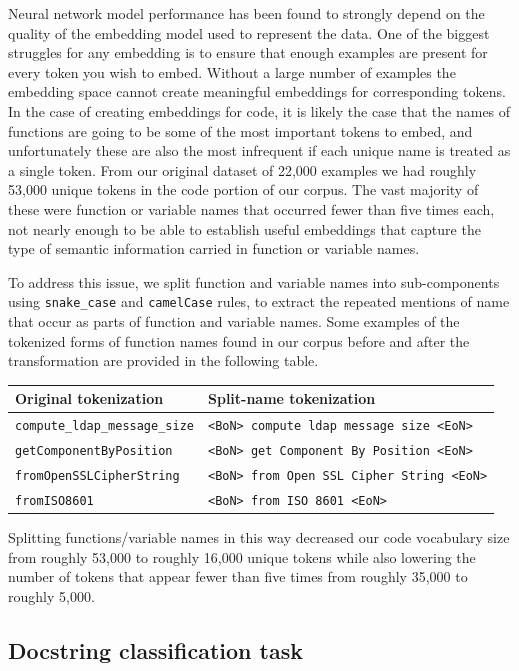 \documentclass[article, 12pt, oneside]{memoir}
\begin{document}
Neural network model performance has been found to strongly depend on
the quality of the embedding model used to represent the data. One of
the biggest struggles for any embedding is to ensure that enough
examples are present for every token you wish to embed. Without a large
number of examples the embedding space cannot create meaningful
embeddings for corresponding tokens. In the case of creating embeddings
for code, it is likely the case that the names of functions are going to
be some of the most important tokens to embed, and unfortunately these
are also the most infrequent if each unique name is treated as a single
token. From our original dataset of 22,000 examples we had roughly
53,000 unique tokens in the code portion of our corpus. The vast
majority of these were function or variable names that occurred fewer
than five times each, not nearly enough to be able to establish useful
embeddings that capture the type of semantic information carried in
function or variable names.

To address this issue, we split function and variable names into
sub-components using \texttt{snake\_case} and \texttt{camelCase} rules,
to extract the repeated mentions of name that occur as parts of function
and variable names. Some examples of the tokenized forms of function
names found in our corpus before and after the transformation are
provided in the following table.

\begin{longtable}[]{@{}ll@{}}
\toprule
Original tokenization & Split-name tokenization\tabularnewline
\midrule
\endhead
\texttt{compute\_ldap\_message\_size} &
\texttt{\textless{}BoN\textgreater{}\ compute\ ldap\ message\ size\ \textless{}EoN\textgreater{}}\tabularnewline
\texttt{getComponentByPosition} &
\texttt{\textless{}BoN\textgreater{}\ get\ Component\ By\ Position\ \textless{}EoN\textgreater{}}\tabularnewline
\texttt{fromOpenSSLCipherString} &
\texttt{\textless{}BoN\textgreater{}\ from\ Open\ SSL\ Cipher\ String\ \textless{}EoN\textgreater{}}\tabularnewline
\texttt{fromISO8601} &
\texttt{\textless{}BoN\textgreater{}\ from\ ISO\ 8601\ \textless{}EoN\textgreater{}}\tabularnewline
\bottomrule
\end{longtable}

Splitting functions/variable names in this way decreased our code
vocabulary size from roughly 53,000 to roughly 16,000 unique tokens
while also lowering the number of tokens that appear fewer than five
times from roughly 35,000 to roughly 5,000.

\hypertarget{docstring-classification-task}{%
\subsection{Docstring classification
task}\label{docstring-classification-task}}
\end{document}

